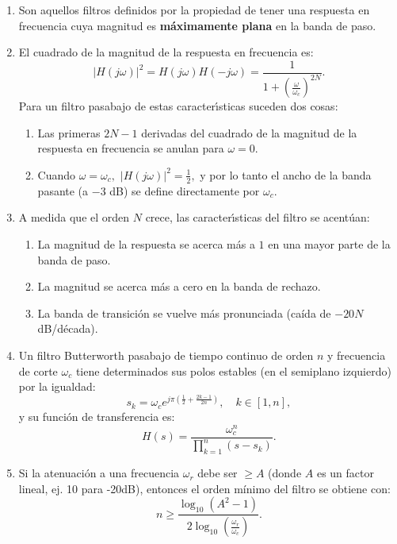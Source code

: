 \documentclass[11pt,a4paper,openany]{book}
\begin{document}
\begin{enumerate}
	\item Son aquellos filtros definidos por la propiedad de tener una respuesta en frecuencia cuya magnitud es \textbf{m\'{a}ximamente plana} en la banda de paso.
	\item El cuadrado de la magnitud de la respuesta en frecuencia es:
	\begin{equation}
		|H(j\omega)|^{2} = H(j\omega) H(-j\omega) = \frac{1}{1 + \left( \frac{\omega}{\omega_c} \right)^{2N}}.
	\end{equation}
	Para un filtro pasabajo de estas caracter\'{\i}sticas suceden dos cosas:
	\begin{enumerate}
		\item Las primeras $2N-1$ derivadas del cuadrado de la magnitud de la respuesta en frecuencia se anulan para $\omega = 0$.
		\item Cuando $\omega = \omega_c,$ $|H(j\omega)|^{2} = \frac{1}{2},$ y por lo tanto el ancho de la banda pasante (a $-3$ dB) se define directamente por $\omega_c.$
	\end{enumerate}
	
	\item A medida que el orden $N$ crece, las caracter\'{\i}sticas del filtro se acent\'{u}an: 
	\begin{enumerate}
		\item La magnitud de la respuesta se acerca m\'{a}s a $1$ en una mayor parte de la banda de paso.
		\item La magnitud se acerca m\'{a}s a cero en la banda de rechazo.
		\item La banda de transici\'{o}n se vuelve más pronunciada (caída de $-20N$ dB/década).
	\end{enumerate}
	
	\item Un filtro Butterworth pasabajo de tiempo continuo de orden $n$ y frecuencia de corte $\omega_c$ tiene determinados sus polos estables (en el semiplano izquierdo) por la igualdad:
	\begin{equation}
		s_{k} = \omega_c e^{j \pi \left(\frac{1}{2} + \frac{2k-1}{2n}\right)}, \quad  k \in [1,n],
	\end{equation}
	y su funci\'{o}n de transferencia es:
	\begin{equation}
		H(s) = \frac{\omega_c^n}{\prod_{k=1}^{n} (s - s_{k})}.
	\end{equation}
	
	\item Si la atenuaci\'{o}n a una frecuencia $\omega_{r}$ debe ser $\ge A$ (donde $A$ es un factor lineal, ej. 10 para -20dB), entonces el orden mínimo del filtro se obtiene con:
	\begin{equation}
		n \ge \frac{\log_{10}(A^{2}-1)}{2 \log_{10}\left(\frac{\omega_{r}}{\omega_{c}}\right)}.
	\end{equation}
\end{enumerate}
\end{document}
